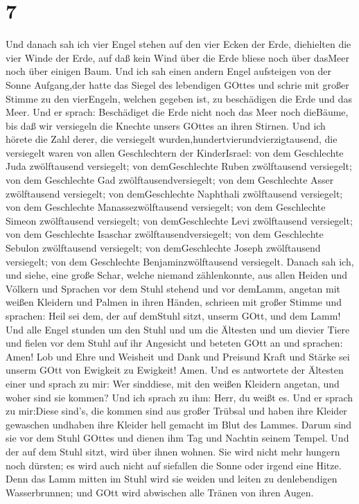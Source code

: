 \hypertarget{section-5}{%
\section{7}\label{section-5}}

 Und danach sah ich vier Engel stehen auf den vier Ecken der
Erde, diehielten die vier Winde der Erde, auf daß kein Wind über die
Erde bliese noch über dasMeer noch über einigen Baum.  Und
ich sah einen andern Engel aufsteigen von der Sonne Aufgang,der hatte
das Siegel des lebendigen GOttes und schrie mit großer Stimme zu den
vierEngeln, welchen gegeben ist, zu beschädigen die Erde und das Meer.
 Und er sprach: Beschädiget die Erde nicht noch das Meer
noch dieBäume, bis daß wir versiegeln die Knechte unsers GOttes an ihren
Stirnen.  Und ich hörete die Zahl derer, die versiegelt
wurden,hundertvierundvierzigtausend, die versiegelt waren von allen
Geschlechtern der KinderIsrael:  von dem Geschlechte Juda
zwölftausend versiegelt; von demGeschlechte Ruben zwölftausend
versiegelt; von dem Geschlechte Gad zwölftausendversiegelt; 
von dem Geschlechte Asser zwölftausend versiegelt; von demGeschlechte
Naphthali zwölftausend versiegelt; von dem Geschlechte
Manassezwölftausend versiegelt;  von dem Geschlechte Simeon
zwölftausend versiegelt; von demGeschlechte Levi zwölftausend
versiegelt; von dem Geschlechte Isaschar zwölftausendversiegelt;
 von dem Geschlechte Sebulon zwölftausend versiegelt; von
demGeschlechte Joseph zwölftausend versiegelt; von dem Geschlechte
Benjaminzwölftausend versiegelt.  Danach sah ich, und siehe,
eine große Schar, welche niemand zählenkonnte, aus allen Heiden und
Völkern und Sprachen vor dem Stuhl stehend und vor demLamm, angetan mit
weißen Kleidern und Palmen in ihren Händen,  schrieen mit
großer Stimme und sprachen: Heil sei dem, der auf demStuhl sitzt, unserm
GOtt, und dem Lamm!  Und alle Engel stunden um den Stuhl
und um die Ältesten und um dievier Tiere und fielen vor dem Stuhl auf
ihr Angesicht und beteten GOtt an  und sprachen: Amen! Lob
und Ehre und Weisheit und Dank und Preisund Kraft und Stärke sei unserm
GOtt von Ewigkeit zu Ewigkeit! Amen.  Und es antwortete der
Ältesten einer und sprach zu mir: Wer sinddiese, mit den weißen Kleidern
angetan, und woher sind sie kommen?  Und ich sprach zu ihm:
Herr, du weißt es. Und er sprach zu mir:Diese sind's, die kommen sind
aus großer Trübsal und haben ihre Kleider gewaschen undhaben ihre
Kleider hell gemacht im Blut des Lammes.  Darum sind sie
vor dem Stuhl GOttes und dienen ihm Tag und Nachtin seinem Tempel. Und
der auf dem Stuhl sitzt, wird über ihnen wohnen.  Sie wird
nicht mehr hungern noch dürsten; es wird auch nicht auf siefallen die
Sonne oder irgend eine Hitze.  Denn das Lamm mitten im
Stuhl wird sie weiden und leiten zu denlebendigen Wasserbrunnen; und
GOtt wird abwischen alle Tränen von ihren Augen.

